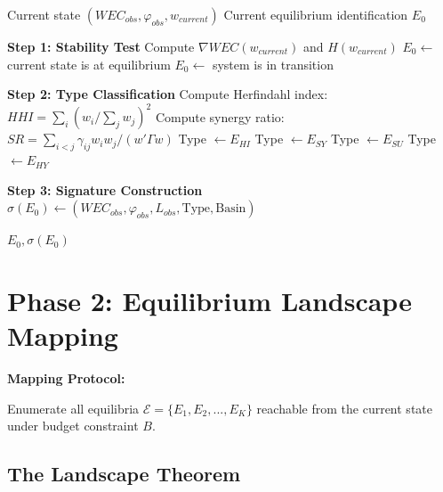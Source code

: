 \begin{algorithm}[H]
\caption{Equilibrium Diagnosis (DIAG)}
\label{alg:diagnosis}
\begin{algorithmic}[1]
\Require Current state $(WEC_{obs}, \varphi_{obs}, w_{current})$
\Ensure Current equilibrium identification $E_0$

\State \textbf{Step 1: Stability Test}
\State Compute $\nabla WEC(w_{current})$ and $H(w_{current})$
    \State $E_0 \gets$ current state is at equilibrium
\Else
    \State $E_0 \gets$ system is in transition
\EndIf

\State \textbf{Step 2: Type Classification}
\State Compute Herfindahl index: $HHI = \sum_i (w_i / \sum_j w_j)^2$
\State Compute synergy ratio: $SR = \sum_{i<j} \gamma_{ij} w_i w_j / (w'\Gamma w)$
    \State Type $\gets E_{HI}$
    \State Type $\gets E_{SY}$
    \State Type $\gets E_{SU}$
\Else
    \State Type $\gets E_{HY}$
\EndIf

\State \textbf{Step 3: Signature Construction}
\State $\sigma(E_0) \gets (WEC_{obs}, \varphi_{obs}, L_{obs}, \text{Type}, \text{Basin})$

\Return $E_0, \sigma(E_0)$
\end{algorithmic}
\end{algorithm}

\section{Phase 2: Equilibrium Landscape Mapping}
\label{sec:meq-landscape}

\begin{tcolorbox}[colback=green!5!white, colframe=green!75!black,
    title=Question 2: What Other Equilibria Exist?]

\textbf{Mapping Protocol:}

Enumerate all equilibria $\mathcal{E} = \{E_1, E_2, ..., E_K\}$ reachable from
the current state under budget constraint $B$.

\end{tcolorbox}

\subsection{The Landscape Theorem}

